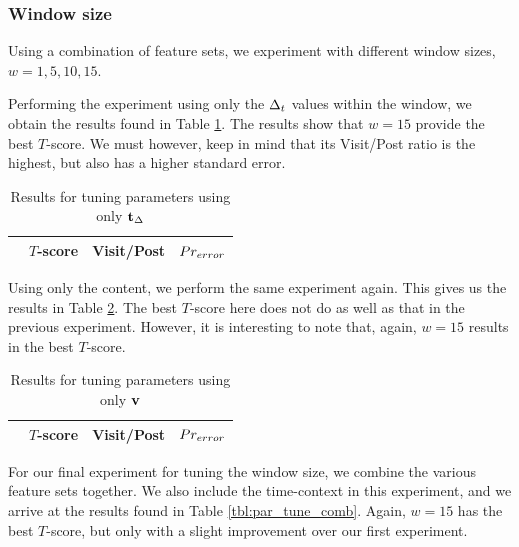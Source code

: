 \subsubsection{Window size}
Using a combination of feature sets, we experiment with different window sizes, 
$w = 1, 5, 10, 15$.

Performing the experiment using only the $\Delta_t$ values within the window, we 
obtain the results found in Table \ref{tbl:par_tune_dt}. The results show that 
$w=15$ provide the best $T$-score. We must however, keep in mind that its 
Visit/Post ratio is the highest, but also has a higher standard error.

\begin{table}
	\footnotesize
\begin{center}
\begin{tabular}{| l | c | c | c |}
\hline
& $T$-score			   &	Visit/Post & 	$Pr_{error}$\\
\hline
	
\hline
\end{tabular}
\end{center}
\caption{Results for tuning parameters using only 
$\mathbf{t}_\Delta$}\label{tbl:par_tune_dt}
\end{table}

Using only the content, we perform the same experiment again. This gives us the 
results in Table \ref{tbl:par_tune_content}. The best $T$-score here does not do 
as well as that in the previous experiment. However, it is interesting to note 
that, again, $w=15$ results in the best $T$-score.

\begin{table}
	\footnotesize
\begin{center}
\begin{tabular}{| l | c | c | c |}
\hline
& $T$-score			   &	Visit/Post & 	$Pr_{error}$\\
\hline
	
\hline
\end{tabular}
\end{center}
\caption{Results for tuning parameters using only 
$\mathbf{v}$}\label{tbl:par_tune_content}
\end{table}

For our final experiment for tuning the window size, we combine the various 
feature sets together. We also include the time-context in this experiment, and 
we arrive at the results found in Table \ref{tbl:par_tune_comb}. Again, $w=15$ 
has the best $T$-score, but only with a slight improvement over our first 
experiment.


